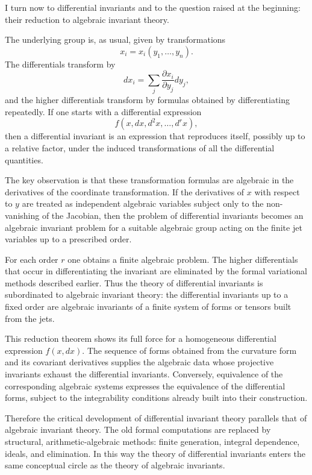 \documentclass[11pt]{article}
\begin{document}
I turn now to differential invariants and to the question raised at the beginning: their reduction to algebraic invariant theory.

The underlying group is, as usual, given by transformations
\begin{equation}
  x_i=x_i(y_1,\ldots,y_n).                                       \tag{4}
\end{equation}
The differentials transform by
\[
  dx_i=\sum_j \frac{\partial x_i}{\partial y_j}dy_j,
\]
and the higher differentials transform by formulas obtained by differentiating repeatedly. If one starts with a differential expression
\[
  f(x,dx,d^2x,\ldots,d^rx),
\]
then a differential invariant is an expression that reproduces itself, possibly up to a relative factor, under the induced transformations of all the differential quantities.

The key observation is that these transformation formulas are algebraic in the derivatives of the coordinate transformation. If the derivatives of $x$ with respect to $y$ are treated as independent algebraic variables subject only to the non-vanishing of the Jacobian, then the problem of differential invariants becomes an algebraic invariant problem for a suitable algebraic group acting on the finite jet variables up to a prescribed order.

For each order $r$ one obtains a finite algebraic problem. The higher differentials that occur in differentiating the invariant are eliminated by the formal variational methods described earlier. Thus the theory of differential invariants is subordinated to algebraic invariant theory: the differential invariants up to a fixed order are algebraic invariants of a finite system of forms or tensors built from the jets.

This reduction theorem shows its full force for a homogeneous differential expression $f(x,dx)$. The sequence of forms obtained from the curvature form and its covariant derivatives supplies the algebraic data whose projective invariants exhaust the differential invariants. Conversely, equivalence of the corresponding algebraic systems expresses the equivalence of the differential forms, subject to the integrability conditions already built into their construction.

Therefore the critical development of differential invariant theory parallels that of algebraic invariant theory. The old formal computations are replaced by structural, arithmetic-algebraic methods: finite generation, integral dependence, ideals, and elimination. In this way the theory of differential invariants enters the same conceptual circle as the theory of algebraic invariants.
\end{document}

